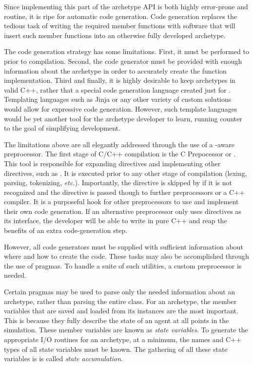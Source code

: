 Since implementing this part of the archetype \gls{API} is both highly error-prone and 
routine, it is ripe for automatic code generation. Code generation replaces the 
tedious task of writing the required member functions with software that will 
insert such member functions into an otherwise fully developed archetype. 

The code generation strategy has some limitations. 
First, it must be 
performed to prior to compilation. Second, the
code generator must be provided with enough information about the archetype in 
order to accurately create the function implementation. Third and finally, it 
is highly desirable to keep archetypes in valid C++, rather that a special 
code generation language created just for \cyclus.
Templating languages 
such as Jinja \cite{ronacher2011jinja2} or any other variety of custom 
solutions would allow for 
expressive code generation. However, such template languages would be yet another 
tool for the archetype developer to learn, running counter to the goal of 
simplifying development.

The limitations above are all elegantly addressed through the use of a 
\cyclus-aware preprocessor. The first stage of C/C++ compilation is the 
C Prepocessor or  \cite{stallman1987c}. This tool is responsible for expanding 
 directives and implementing other \code{#} directives, such as 
. It is executed
prior to any other stage of compilation (lexing, parsing, tokenizing, \emph{etc.}).
Importantly, the  directive is skipped by  if it is not 
recognized and the directive is passed though to further preprocessors or a C++ 
compiler. It is a
purposeful hook for other preprocessors to use and implement their own code generation.
If an alternative preprocessor only uses  directives as its interface, 
the developer will be able to write in pure C++ and reap the benefits
of an extra code-generation step. 

However, all code generators must be supplied with sufficient information about
where and how to create the code. These tasks may also be accomplished through 
the use of pragmas. To handle a suite of such utilities, a custom preprocessor
is needed.

Certain pragmas may be used to parse only the needed information 
about an archetype, rather than parsing the entire class. For an archetype, the 
member variables that are saved and loaded from its instances are the most important.
This is because they fully describe the state of an agent 
at all points in the simulation. These member variables are known as \emph{state variables}. 
To generate the appropriate I/O routines for an archetype, at a minimum, the names and C++ types 
of all state variables must be known. The gathering of all these state variables is is 
called \emph{state accumulation}. 

